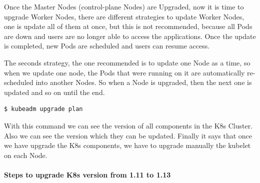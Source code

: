 \documentclass{article}
\newenvironment{codetemplate}[1][]{%
  \mybasecolorbox[#1]
  \itshape
}{%
  \endmybasecolorbox
}
\begin{document}
Once the Master Nodes (control-plane Nodes) are Upgraded, now it is time to upgrade Worker Nodes, there are different strategies to update Worker Nodes, one is update all of them at once, but this is not recommended, because all Pods are down and users are no longer able to access the applications. Once the update is completed, new Pods are scheduled and users can resume access.

The seconds strategy, the one recommended is to update one Node as a time, so when we update one node, the Pods that were running on it are automatically re-scheduled into another Nodes. So when a Node is upgraded, then the next one is updated and so on until the end.

\begin{codetemplate}{}
\begin{verbatim}
$ kubeadm upgrade plan
\end{verbatim}
\end{codetemplate}

With this command we can see the version of all components in the K8s Cluster. Also we can see the version which they can be updated. Finally it says that once we have upgrade the K8s components, we have to upgrade manually the kubelet on each Node.

\paragraph{Steps to upgrade K8s version from 1.11 to 1.13}
\end{document}

